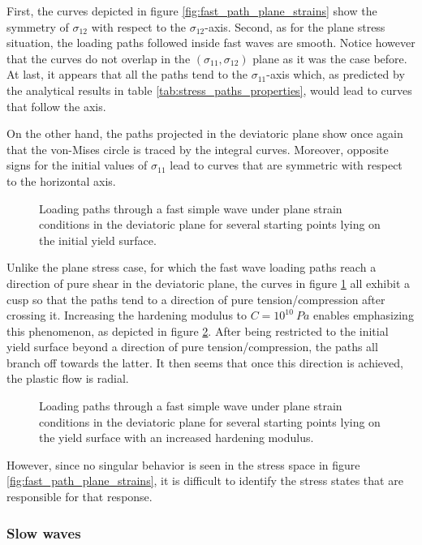 First, the curves depicted in figure \ref{fig:fast_path_plane_strains} show the symmetry of $\sigma_{12}$ with respect to the $\sigma_{12}$-axis.
Second, as for the plane stress situation, the loading paths followed inside fast waves are smooth.
Notice however that the curves do not overlap in the $(\sigma_{11},\sigma_{12})$ plane as it was the case before.
At last, it appears that all the paths tend to the $\sigma_{11}$-axis which, as predicted by the analytical results in table \ref{tab:stress_paths_properties}, would lead to curves that follow the axis.


On the other hand, the paths projected in the deviatoric plane show once again that the von-Mises circle is traced by the integral curves.
Moreover, opposite signs for the initial values of $\sigma_{11}$ lead to curves that are symmetric with respect to the horizontal axis.
\begin{figure}[h!]
  \centering
  
  \caption{Loading paths through a fast simple wave under plane strain conditions in the deviatoric plane for several starting points lying on the initial yield surface.}
  \label{fig:fastDP_dev}
\end{figure}
Unlike the plane stress case, for which the fast wave loading paths reach a direction of pure shear in the deviatoric plane, the curves in figure \ref{fig:fastDP_dev} all exhibit a cusp so that the paths tend to a direction of pure tension/compression after crossing it. 
Increasing the hardening modulus to $C=10^{10} \:Pa$ enables emphasizing this phenomenon, as depicted in figure \ref{fig:fastDP_devH}.
After being restricted to the initial yield surface beyond a direction of pure tension/compression, the paths all branch off towards the latter.
It then seems that once this direction is achieved, the plastic flow is radial.
\begin{figure}[h!]
  \centering
  
  \caption{Loading paths through a fast simple wave under plane strain conditions in the deviatoric plane for several starting points lying on the yield surface with an increased hardening modulus.}
  \label{fig:fastDP_devH}
\end{figure}
However, since no singular behavior is seen in the stress space in figure \ref{fig:fast_path_plane_strains}, it is difficult to identify the stress states that are responsible for that response.


\subsubsection{Slow waves}

